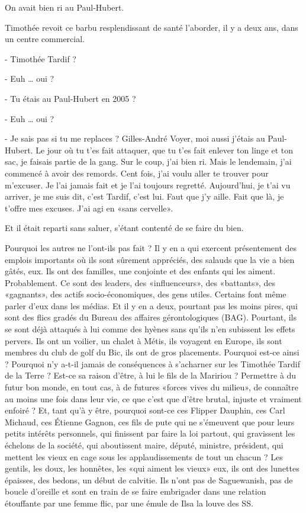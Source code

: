 On avait bien ri au Paul-Hubert.

Timothée revoit ce barbu resplendissant de santé l’aborder, il y a deux ans, dans un centre commercial.

- Timothée Tardif ?

- Euh … oui ?

- Tu étais au Paul-Hubert en 2005 ?

- Euh … oui ?

- Je sais pas si tu me replaces ? Gilles-André Voyer, moi aussi j’étais au Paul-Hubert. Le jour où tu t’es fait attaquer, que tu t’es fait enlever ton linge et ton sac, je faisais partie de la gang. Sur le coup, j’ai bien ri. Mais le lendemain, j’ai commencé à avoir des remords. Cent fois, j’ai voulu aller te trouver pour m’excuser. Je l’ai jamais fait et je l’ai toujours regretté. Aujourd’hui, je t’ai vu arriver, je me suis dit, c’est Tardif, c’est lui. Faut que j’y aille. Fait que là, je t’offre mes excuses. J’ai agi en «sans cervelle».

Et il était reparti sans saluer, s’étant contenté de se faire du bien.

Pourquoi les autres ne l’ont-ils pas fait ? Il y en a qui exercent présentement des emplois importants où ils sont sûrement appréciés, des salauds que la vie a bien gâtés, eux. Ils ont des familles, une conjointe et des enfants qui les aiment. Probablement. Ce sont des leaders, des «influenceurs», des «battants», des «gagnants», des actifs socio-économiques, des gens utiles. Certains font même parler d’eux dans les médias. Et il y en a deux, pourtant pas les moins pires, qui sont des flics gradés du Bureau des affaires gérontologiques (BAG). Pourtant, ils se sont déjà attaqués à lui comme des hyènes sans qu’ils n’en subissent les effets pervers. Ils ont un voilier, un chalet à Métis, ils voyagent en Europe, ils sont membres du club de golf du Bic, ils ont de gros placements. Pourquoi est-ce ainsi ? Pourquoi n’y a-t-il jamais de conséquences à s’acharner sur les Timothée Tardif de la Terre ? Est-ce sa raison d’être, à lui le fils de la Maririou ? Permettre à du futur bon monde, en tout cas, à de futures «forces vives du milieu», de connaître au moins une fois dans leur vie, ce que c’est que d’être brutal, injuste et vraiment enfoiré ? Et, tant qu’à y être, pourquoi sont-ce ces Flipper Dauphin, ces Carl Michaud, ces Étienne Gagnon, ces fils de pute qui ne s’émeuvent que pour leurs petits intérêts personnels, qui finissent par faire la loi partout, qui gravissent les échelons de la société, qui aboutissent maire, député, ministre, président, qui mettent les vieux en cage sous les applaudissements de tout un chacun ? Les gentils, les doux, les honnêtes, les «qui aiment les vieux» eux, ils ont des lunettes épaisses, des bedons, un début de calvitie. Ils n’ont pas de Saguewanish, pas de boucle d’oreille et sont en train de se faire embrigader dans une relation étouffante par une femme flic, par une émule de Ilsa la louve des SS.

